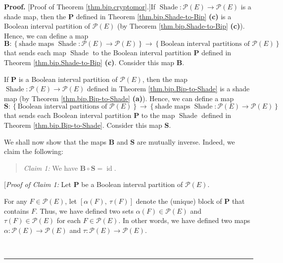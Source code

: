 \documentclass[numbers=enddot,12pt,final,onecolumn]{scrartcl}%
\theoremstyle{definition}
\newenvironment{statement}{\begin{quote}}{\end{quote}}
\newenvironment{proof}[1][Proof]{\noindent\textbf{#1.} }{\ \rule{0.5em}{0.5em}}
\newenvironment{verlong}{}{}
\begin{document}
\begin{verlong}
\begin{proof}
[Proof of Theorem \ref{thm.bip.cryptomor}.]If $\operatorname*{Shade}%
:\mathcal{P}\left(  E\right)  \rightarrow\mathcal{P}\left(  E\right)  $ is a
shade map, then the $\mathbf{P}$ defined in Theorem \ref{thm.bip.Shade-to-Bip}
\textbf{(c)} is a Boolean interval partition of $\mathcal{P}\left(  E\right)
$ (by Theorem \ref{thm.bip.Shade-to-Bip} \textbf{(c)}). Hence, we can define a
map%
\[
\mathbf{B}:\left\{  \text{shade maps }\operatorname*{Shade}:\mathcal{P}\left(
E\right)  \rightarrow\mathcal{P}\left(  E\right)  \right\}  \rightarrow
\left\{  \text{Boolean interval partitions of }\mathcal{P}\left(  E\right)
\right\}
\]
that sends each map $\operatorname*{Shade}$ to the Boolean interval partition
$\mathbf{P}$ defined in Theorem \ref{thm.bip.Shade-to-Bip}\textbf{ (c)}.
Consider this map $\mathbf{B}$.

If $\mathbf{P}$ is a Boolean interval partition of $\mathcal{P}\left(
E\right)  $, then the map $\operatorname*{Shade}:\mathcal{P}\left(  E\right)
\rightarrow\mathcal{P}\left(  E\right)  $ defined in Theorem
\ref{thm.bip.Bip-to-Shade} is a shade map (by Theorem
\ref{thm.bip.Bip-to-Shade} \textbf{(a)}). Hence, we can define a map%
\[
\mathbf{S}:\left\{  \text{Boolean interval partitions of }\mathcal{P}\left(
E\right)  \right\}  \rightarrow\left\{  \text{shade maps }%
\operatorname*{Shade}:\mathcal{P}\left(  E\right)  \rightarrow\mathcal{P}%
\left(  E\right)  \right\}
\]
that sends each Boolean interval partition $\mathbf{P}$ to the map
$\operatorname*{Shade}$ defined in Theorem \ref{thm.bip.Bip-to-Shade}.
Consider this map $\mathbf{S}$.

We shall now show that the maps $\mathbf{B}$ and $\mathbf{S}$ are mutually
inverse. Indeed, we claim the following:

\begin{statement}
\textit{Claim 1:} We have $\mathbf{B}\circ\mathbf{S}=\operatorname*{id}$.
\end{statement}

[\textit{Proof of Claim 1:} Let $\mathbf{P}$ be a Boolean interval partition
of $\mathcal{P}\left(  E\right)  $.

For any $F\in\mathcal{P}\left(  E\right)  $, let $\left[  \alpha\left(
F\right)  ,\ \tau\left(  F\right)  \right]  $ denote the (unique) block of
$\mathbf{P}$ that contains $F$. Thus, we have defined two sets $\alpha\left(
F\right)  \in\mathcal{P}\left(  E\right)  $ and $\tau\left(  F\right)
\in\mathcal{P}\left(  E\right)  $ for each $F\in\mathcal{P}\left(  E\right)
$. In other words, we have defined two maps $\alpha:\mathcal{P}\left(
E\right)  \rightarrow\mathcal{P}\left(  E\right)  $ and $\tau:\mathcal{P}%
\left(  E\right)  \rightarrow\mathcal{P}\left(  E\right)  $.


\end{proof}
\end{verlong}
\end{document}
